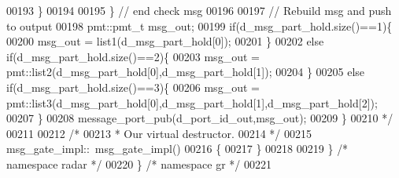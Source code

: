 \begin{DoxyCode}
00193 \textcolor{comment}{            \}}
00194 \textcolor{comment}{            }
00195 \textcolor{comment}{        \} // end check msg}
00196 \textcolor{comment}{        }
00197 \textcolor{comment}{        // Rebuild msg and push to output}
00198 \textcolor{comment}{        pmt::pmt\_t msg\_out;}
00199 \textcolor{comment}{        if(d\_msg\_part\_hold.size()==1)\{}
00200 \textcolor{comment}{            msg\_out = list1(d\_msg\_part\_hold[0]);}
00201 \textcolor{comment}{        \}}
00202 \textcolor{comment}{        else if(d\_msg\_part\_hold.size()==2)\{}
00203 \textcolor{comment}{            msg\_out = pmt::list2(d\_msg\_part\_hold[0],d\_msg\_part\_hold[1]);}
00204 \textcolor{comment}{        \}}
00205 \textcolor{comment}{        else if(d\_msg\_part\_hold.size()==3)\{}
00206 \textcolor{comment}{            msg\_out = pmt::list3(d\_msg\_part\_hold[0],d\_msg\_part\_hold[1],d\_msg\_part\_hold[2]);}
00207 \textcolor{comment}{        \}}
00208 \textcolor{comment}{        message\_port\_pub(d\_port\_id\_out,msg\_out);}
00209 \textcolor{comment}{    \}}
00210 \textcolor{comment}{    */}
00211     
00212     \textcolor{comment}{/*}
00213 \textcolor{comment}{     * Our virtual destructor.}
00214 \textcolor{comment}{     */}
00215     msg_gate_impl::~msg_gate_impl()
00216     \{
00217     \}
00218 
00219   \} \textcolor{comment}{/* namespace radar */}
00220 \} \textcolor{comment}{/* namespace gr */}
00221 
\end{DoxyCode}
